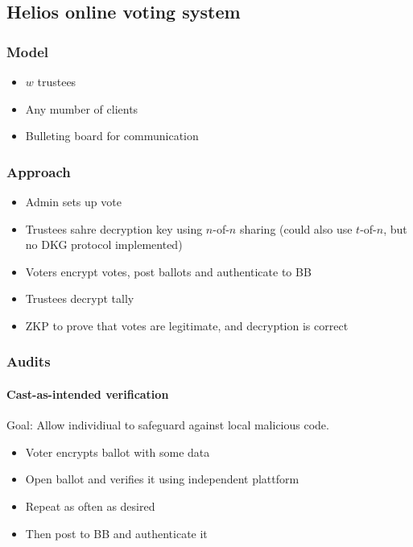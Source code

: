 \subsection{Helios online voting system}

\subsubsection{Model}

\begin{itemize}
		\item $w$ trustees
		\item Any mumber of clients
		\item Bulleting board for communication
\end{itemize}

\subsubsection{Approach}

\begin{itemize}
		\item Admin sets up vote
		\item Trustees sahre decryption key using $n$-of-$n$ sharing (could
				also use $t$-of-$n$, but no DKG protocol implemented)
		\item Voters encrypt votes, post ballots and authenticate to BB
		\item Trustees decrypt tally
		\item ZKP to prove that votes are legitimate, and decryption is correct
\end{itemize}

\subsubsection{Audits}

\paragraph{Cast-as-intended verification}

Goal: Allow individiual to safeguard against local malicious code.

\begin{itemize}
		\item Voter encrypts ballot with some data
		\item Open ballot and verifies it using independent plattform
		\item Repeat as often as desired
		\item Then post to BB and authenticate it
\end{itemize}

